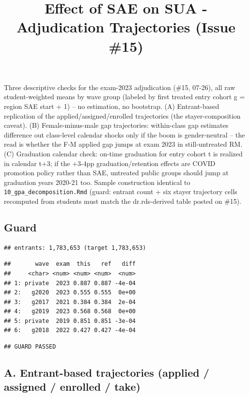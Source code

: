 \documentclass[
]{article}
\title{Effect of SAE on SUA - Adjudication Trajectories (Issue \#15)}
\author{}
\date{\vspace{-2.5em}}
\begin{document}
\maketitle

Three descriptive checks for the exam-2023 adjudication (\#15, 07-26),
all raw student-weighted means by wave group (labeled by first treated
entry cohort g = region SAE start + 1) -- no estimation, no bootstrap.
(A) Entrant-based replication of the applied/assigned/enrolled
trajectories (the stayer-composition caveat). (B) Female-minus-male gap
trajectories: within-class gap estimates difference out class-level
calendar shocks only if the boom is gender-neutral -- the read is
whether the F-M applied gap jumps at exam 2023 in still-untreated RM.
(C) Graduation calendar check: on-time graduation for entry cohort t is
realized in calendar t+3; if the +3-4pp graduation/retention effects are
COVID promotion policy rather than SAE, untreated public groups should
jump at graduation years 2020-21 too. Sample construction identical to
\texttt{10\_gpa\_decomposition.Rmd} (guard: entrant count + six stayer
trajectory cells recomputed from students must match the dr.rds-derived
table posted on \#15).

\hypertarget{guard}{%
\subsection{Guard}\label{guard}}

\begin{verbatim}
## entrants: 1,783,653 (target 1,783,653)
\end{verbatim}

\begin{verbatim}
##       wave  exam  this   ref   diff
##     <char> <num> <num> <num>  <num>
## 1: private  2023 0.887 0.887 -4e-04
## 2:   g2020  2023 0.555 0.555  0e+00
## 3:   g2017  2021 0.384 0.384  2e-04
## 4:   g2019  2023 0.568 0.568  0e+00
## 5: private  2019 0.851 0.851 -3e-04
## 6:   g2018  2022 0.427 0.427 -4e-04
\end{verbatim}

\begin{verbatim}
## GUARD PASSED
\end{verbatim}

\hypertarget{a.-entrant-based-trajectories-applied-assigned-enrolled-take}{%
\subsection{A. Entrant-based trajectories (applied / assigned / enrolled
/
take)}\label{a.-entrant-based-trajectories-applied-assigned-enrolled-take}}
\end{document}
